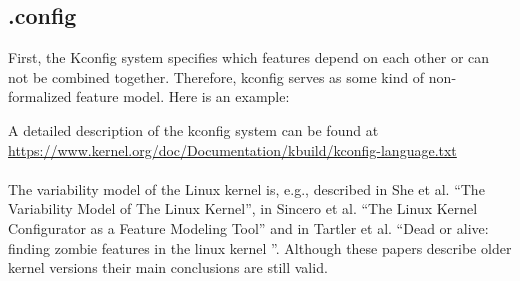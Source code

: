 \subsection{.config}

First, the Kconfig system specifies which features depend on each other or can not be combined together. 
Therefore, kconfig serves as some kind of non-formalized feature model.
Here is an example:


A detailed description of the kconfig system can be found at
\url{https://www.kernel.org/doc/Documentation/kbuild/kconfig-language.txt}\cite{Kernel_4} 
\\ \ \\
The variability model of the Linux kernel is, e.g., described in She et al. 
``The Variability Model of The Linux Kernel''\cite{she2010variability},
in Sincero et al. ``The Linux Kernel Configurator as a Feature Modeling Tool''\cite{sincero2008linux}
and in Tartler et al. ``Dead or alive: finding zombie features in the linux kernel
''\cite{tartler2009dead}.
Although these papers describe older kernel versions their main conclusions are still valid.

